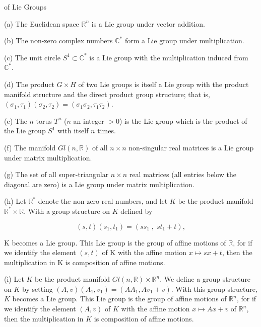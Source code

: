 \begin{examples}{of Lie Groups}\label{thm:3.3}

(a) The Euclidean space  $ \mathbb{R}^{n} $ is a Lie group under vector addition.

(b) The non-zero complex numbers  $ \mathbb{C}^{*} $ form a Lie group under multiplication.

(c) The unit circle  $ S^{1} \subset \mathbb{C}^{*} $ is a Lie group with the multiplication induced from  $ \mathbb{C}^{*} $.

(d) The product $G \times H$ of two Lie groups is itself a Lie group with the product manifold structure and the direct product group structure; that is, $(\sigma_{1},\tau_{1})(\sigma_{2},\tau_{2}) = (\sigma_{1}\sigma_{2},\tau_{1}\tau_{2})$.

(e) The $n$-torus $T^{n}$ ($n$ an integer $>0$) is the Lie group which is the product of the Lie group $S^{1}$ with itself $n$ times.

(f) The manifold $Gl(n,\mathbb{R})$ of all $n\times n$ non-singular real matrices is a Lie group under matrix multiplication.

(g) The set of all super-triangular $n \times n$ real matrices (all entries below the diagonal are zero) is a Lie group under matrix multiplication.

(h) Let $\mathbb{R}^{*}$ denote the non-zero real numbers, and let $K$ be the product manifold $\mathbb{R}^{*} \times \mathbb{R}$. With a group structure on $K$ defined by

\[
(s,t)(s_{1},t_{1})=(s s_{1}\;,\;s t_{1}+t),
\]

K becomes a Lie group. This Lie group is the group of affine motions of  $ \mathbb{R} $, for if we identify the element  $ (s,t) $ of K with the affine motion  $ x \mapsto sx + t $, then the multiplication in K is composition of affine motions.

(i) Let $K$ be the product manifold $Gl(n,\mathbb{R}) \times \mathbb{R}^n$. We define a group structure on $K$ by setting $(A,v)(A_1,v_1)=(AA_1,Av_1+v)$. With this group structure, $K$ becomes a Lie group. This Lie group is the group of affine motions of $\mathbb{R}^n$, for if we identify the element $(A,v)$ of $K$ with the affine motion $x \mapsto Ax + v$ of $\mathbb{R}^n$, then the multiplication in $K$ is composition of affine motions.

\end{examples}

